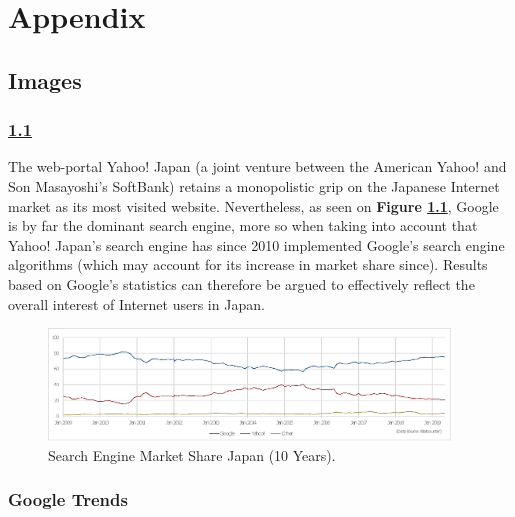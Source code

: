 \documentclass[10pt,british,A4paper,,openany]{memoir}
\begin{document}
\endgroup

\newpage

\appendix
{} 

\chapter{Appendix}\label{appendix}

\section{Images}\label{images}

\subsection{\texorpdfstring{\ref{fig:searchengine}}{}}\label{section}

The web-portal Yahoo! Japan (a joint venture between the American Yahoo!
and Son Masayoshi's SoftBank) retains a monopolistic grip on the
Japanese Internet market as its most visited website. Nevertheless, as
seen on \textbf{Figure \ref{fig:searchengine}}, Google is by far the
dominant search engine, more so when taking into account that Yahoo!
Japan's search engine has since 2010 implemented Google's search engine
algorithms (which may account for its increase in market share since).
Results based on Google's statistics can therefore be argued to
effectively reflect the overall interest of Internet users in Japan.

\begin{figure}[!htb]
 \centering
 \caption{\label{fig:searchengine} Search Engine Market Share Japan (10 Years).}
 \includegraphics[width=0.95\textwidth,trim=4 4 4 4,clip]{images/searchengine.eps}
 \end{figure}

\subsection{Google Trends}\label{google-trends}

\label{appendix:googletrends}
\end{document}
